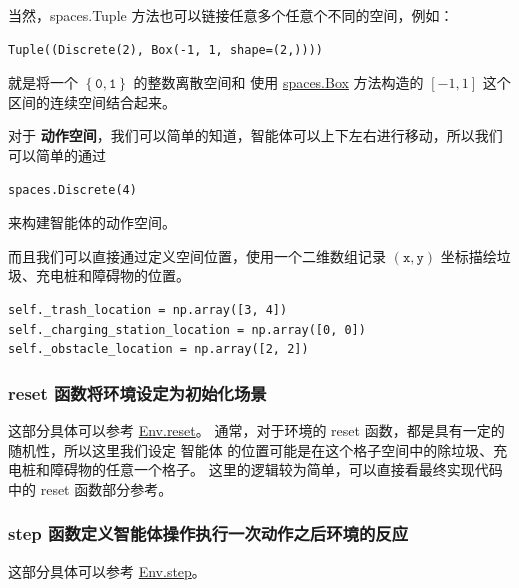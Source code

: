 当然，{\textsf{spaces.Tuple}} 方法也可以链接任意多个任意个不同的空间，例如：
\begin{verbatim}
Tuple((Discrete(2), Box(-1, 1, shape=(2,))))
\end{verbatim}
就是将一个 \(\left\{ \mathtt{0}, \mathtt{1} \right\}\) 的整数离散空间和 使用 \href{https://gymnasium.farama.org/api/spaces/fundamental/#gymnasium.spaces.Box}{\textsf{spaces.Box}} 方法构造的 \(\left[ -1, 1 \right]\) 这个区间的连续空间结合起来。

对于 \textbf{动作空间}，我们可以简单的知道，智能体可以上下左右进行移动，所以我们可以简单的通过 
\begin{verbatim}
spaces.Discrete(4)
\end{verbatim}
来构建智能体的动作空间。

而且我们可以直接通过定义空间位置，使用一个二维数组记录 \(\left( \texttt{x}, \texttt{y} \right)\) 坐标描绘垃圾、充电桩和障碍物的位置。
\begin{verbatim}
self._trash_location = np.array([3, 4])
self._charging_station_location = np.array([0, 0])
self._obstacle_location = np.array([2, 2])
\end{verbatim}

\subsubsection{\textsf{reset} 函数将环境设定为初始化场景}

这部分具体可以参考 \href{https://gymnasium.farama.org/api/env/#gymnasium.Env.reset}{\textsf{Env.reset}}。
通常，对于环境的 \textsf{reset} 函数，都是具有一定的随机性，所以这里我们设定 智能体 的位置可能是在这个格子空间中的除垃圾、充电桩和障碍物的任意一个格子。
这里的逻辑较为简单，可以直接看最终实现代码中的 \textsf{reset} 函数部分参考。

\subsubsection{\textsf{step} 函数定义智能体操作执行一次动作之后环境的反应}

这部分具体可以参考 \href{https://gymnasium.farama.org/api/env/#gymnasium.Env.step}{\textsf{Env.step}}。

